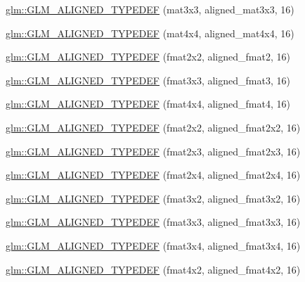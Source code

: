 \begin{DoxyCompactItemize}
\item 
\hyperlink{group__gtx__type__aligned_gac88a191b004bd341e64fc53b5a4d00e3}{glm\+::\+G\+L\+M\+\_\+\+A\+L\+I\+G\+N\+E\+D\+\_\+\+T\+Y\+P\+E\+D\+E\+F} (mat3x3, aligned\+\_\+mat3x3, 16)
\item 
\hyperlink{group__gtx__type__aligned_gabe8c745fa2ced44a600a6e3f19991161}{glm\+::\+G\+L\+M\+\_\+\+A\+L\+I\+G\+N\+E\+D\+\_\+\+T\+Y\+P\+E\+D\+E\+F} (mat4x4, aligned\+\_\+mat4x4, 16)
\item 
\hyperlink{group__gtx__type__aligned_ga719da577361541a4c43a2dd1d0e361e1}{glm\+::\+G\+L\+M\+\_\+\+A\+L\+I\+G\+N\+E\+D\+\_\+\+T\+Y\+P\+E\+D\+E\+F} (fmat2x2, aligned\+\_\+fmat2, 16)
\item 
\hyperlink{group__gtx__type__aligned_ga6e7ee4f541e1d7db66cd1a224caacafb}{glm\+::\+G\+L\+M\+\_\+\+A\+L\+I\+G\+N\+E\+D\+\_\+\+T\+Y\+P\+E\+D\+E\+F} (fmat3x3, aligned\+\_\+fmat3, 16)
\item 
\hyperlink{group__gtx__type__aligned_gae5d672d359f2a39f63f98c7975057486}{glm\+::\+G\+L\+M\+\_\+\+A\+L\+I\+G\+N\+E\+D\+\_\+\+T\+Y\+P\+E\+D\+E\+F} (fmat4x4, aligned\+\_\+fmat4, 16)
\item 
\hyperlink{group__gtx__type__aligned_ga6fa2df037dbfc5fe8c8e0b4db8a34953}{glm\+::\+G\+L\+M\+\_\+\+A\+L\+I\+G\+N\+E\+D\+\_\+\+T\+Y\+P\+E\+D\+E\+F} (fmat2x2, aligned\+\_\+fmat2x2, 16)
\item 
\hyperlink{group__gtx__type__aligned_ga0743b4f4f69a3227b82ff58f6abbad62}{glm\+::\+G\+L\+M\+\_\+\+A\+L\+I\+G\+N\+E\+D\+\_\+\+T\+Y\+P\+E\+D\+E\+F} (fmat2x3, aligned\+\_\+fmat2x3, 16)
\item 
\hyperlink{group__gtx__type__aligned_ga1a76b325fdf70f961d835edd182c63dd}{glm\+::\+G\+L\+M\+\_\+\+A\+L\+I\+G\+N\+E\+D\+\_\+\+T\+Y\+P\+E\+D\+E\+F} (fmat2x4, aligned\+\_\+fmat2x4, 16)
\item 
\hyperlink{group__gtx__type__aligned_ga4b4e181cd041ba28c3163e7b8074aef0}{glm\+::\+G\+L\+M\+\_\+\+A\+L\+I\+G\+N\+E\+D\+\_\+\+T\+Y\+P\+E\+D\+E\+F} (fmat3x2, aligned\+\_\+fmat3x2, 16)
\item 
\hyperlink{group__gtx__type__aligned_ga27b13f465abc8a40705698145e222c3f}{glm\+::\+G\+L\+M\+\_\+\+A\+L\+I\+G\+N\+E\+D\+\_\+\+T\+Y\+P\+E\+D\+E\+F} (fmat3x3, aligned\+\_\+fmat3x3, 16)
\item 
\hyperlink{group__gtx__type__aligned_ga2608d19cc275830a6f8c0b6405625a4f}{glm\+::\+G\+L\+M\+\_\+\+A\+L\+I\+G\+N\+E\+D\+\_\+\+T\+Y\+P\+E\+D\+E\+F} (fmat3x4, aligned\+\_\+fmat3x4, 16)
\item 
\hyperlink{group__gtx__type__aligned_ga93f09768241358a287c4cca538f1f7e7}{glm\+::\+G\+L\+M\+\_\+\+A\+L\+I\+G\+N\+E\+D\+\_\+\+T\+Y\+P\+E\+D\+E\+F} (fmat4x2, aligned\+\_\+fmat4x2, 16)

\end{DoxyCompactItemize}
